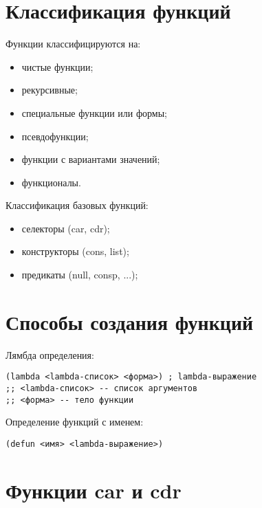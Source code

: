 \section{Классификация функций}

Функции классифицируются на:

\begin{itemize}
    \item чистые функции;
    \item рекурсивные;
    \item специальные функции или формы;
    \item псевдофункции;
    \item функции с вариантами значений;
    \item функционалы.
\end{itemize}

Классификация базовых функций:
\begin{itemize}
    \item селекторы (car, cdr);
    \item конструкторы (cons, list);
    \item предикаты (null, consp, ...);
\end{itemize}


\section{Способы создания функций}

Лямбда определения:

\vspace{4mm}
\begin{minipage}{0.92\linewidth}
\begin{lstlisting}
(lambda <lambda-список> <форма>) ; lambda-выражение
;; <lambda-список> -- список аргументов
;; <форма> -- тело функции
\end{lstlisting}
\end{minipage}

Определение функций с именем:

\vspace{4mm}
\begin{minipage}{0.92\linewidth}
\begin{lstlisting}
(defun <имя> <lambda-выражение>)
\end{lstlisting}
\end{minipage}

\section{Функции car и cdr}

